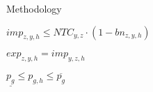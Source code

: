 \documentclass[aspectratio=169]{beamer}
\begin{document}
\begin{frame}{Methodology}
\begin{minipage}[t]{0.78\textwidth}
        \vspace{-0.55cm}
        \begin{coloredblock}[blue][][][][2.35cm][][0ex][0ex]
            \vspace{0.35cm}
            \begin{center}
                \small$imp_{z,y,h} \leq NTC_{y,z} \cdot (1-bn_{z,y,h})$
            \end{center}
        \end{coloredblock}
        \vspace{-0.55cm}
        \begin{coloredblock}[blue][][][][2.35cm][][0ex][0ex]
            \vspace{0.35cm}
            \begin{center}
                \small$exp_{z,y,h} = imp_{y,z,h}$
            \end{center}
        \end{coloredblock}
        \vspace{-0.55cm}
        \begin{coloredblock}[blue][][][][2.35cm][][0ex][0ex]
            \vspace{0.35cm}
            \begin{center}
                \small$\underline{p_g} \leq p_{g,h} \leq \overline{p_g}$
            \end{center}
        \end{coloredblock}
    \end{minipage}
    
\end{frame}
\end{document}
